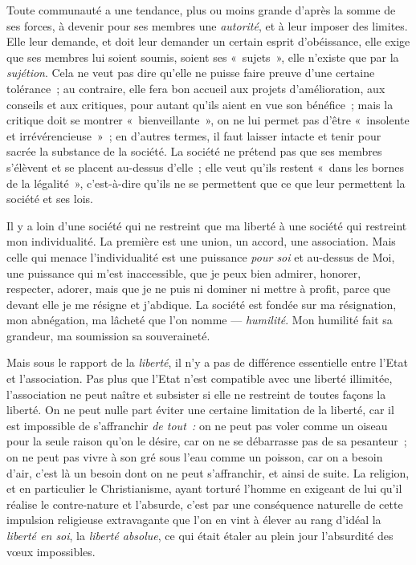 \documentclass[french,twoside]{book} %
\begin{document}
Toute communauté a une tendance, plus ou moins grande d’après la somme de ses forces, à devenir pour ses membres une \emph{autorité}, et à leur imposer des limites.  Elle leur demande, et doit leur demander un certain esprit d’obéissance, elle exige que ses membres lui soient soumis, soient ses « sujets », elle n’existe que par la \emph{sujétion}. Cela ne veut pas dire qu’elle ne puisse faire preuve d’une certaine tolérance ; au contraire, elle fera bon accueil aux projets d’amélioration, aux conseils et aux critiques, pour autant qu’ils aient en vue son bénéfice ; mais la critique doit se montrer « bienveillante », on ne lui permet pas d’être « insolente et irrévérencieuse » ; en d’autres termes, il faut laisser intacte et tenir pour sacrée la substance de la société. La société ne prétend pas que ses membres s’élèvent et se placent au-dessus d’elle ; elle veut qu’ils restent « dans les bornes de la légalité », c’est-à-dire qu’ils ne se permettent que ce que leur permettent la société et ses lois.\par
Il y a loin d’une société qui ne restreint que ma liberté à une société qui restreint mon individualité. La première est une union, un accord, une association. Mais celle qui menace l’individualité est une puissance \emph{pour soi} et au-dessus de Moi, une puissance qui m’est inaccessible, que je peux bien admirer, honorer, respecter, adorer, mais que je ne puis ni dominer ni mettre à profit, parce que devant elle je me résigne et j’abdique. La société est fondée sur ma résignation, mon abnégation, ma lâcheté que l’on nomme — \emph{humilité}. Mon humilité fait sa grandeur, ma soumission sa souveraineté.\par
Mais sous le rapport de la \emph{liberté}, il n’y a pas de différence essentielle entre l’Etat et l’association. Pas plus que l’Etat n’est compatible avec une liberté illimitée, l’association ne peut naître et subsister si elle ne restreint de toutes façons la liberté. On ne peut nulle part éviter une certaine limitation de la liberté, car il est impossible de s’affranchir \emph{de tout :} on ne peut pas voler comme un oiseau pour la seule raison qu’on le désire, car on ne se débarrasse pas de sa pesanteur ; on ne peut pas vivre à son gré sous l’eau comme un poisson,  car on a besoin d’air, c’est là un besoin dont on ne peut s’affranchir, et ainsi de suite. La religion, et en particulier le Christianisme, ayant torturé l’homme en exigeant de lui qu’il réalise le contre-nature et l’absurde, c’est par une conséquence naturelle de cette impulsion religieuse extravagante que l’on en vint à élever au rang d’idéal la \emph{liberté en soi}, la \emph{liberté absolue}, ce qui était étaler au plein jour l’absurdité des vœux impossibles.\par
\end{document}
